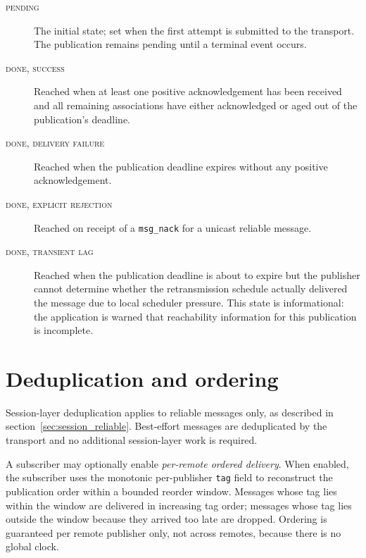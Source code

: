 \begin{description}
    \item[\textsc{pending}] The initial state; set when the first attempt is
    submitted to the transport. The publication remains pending until a
    terminal event occurs.
    \item[\textsc{done, success}] Reached when at least one positive
    acknowledgement has been received and all remaining associations have
    either acknowledged or aged out of the publication's deadline.
    \item[\textsc{done, delivery failure}] Reached when the publication
    deadline expires without any positive acknowledgement.
    \item[\textsc{done, explicit rejection}] Reached on receipt of a
    \texttt{msg\_nack} for a unicast reliable message.
    \item[\textsc{done, transient lag}] Reached when the publication
    deadline is about to expire but the publisher cannot determine whether
    the retransmission schedule actually delivered the message due to local
    scheduler pressure. This state is informational: the application is
    warned that reachability information for this publication is
    incomplete.
\end{description}

\section{Deduplication and ordering}\label{sec:session_dedup}

Session-layer deduplication applies to reliable messages only, as described in
section~\ref{sec:session_reliable}. Best-effort messages are deduplicated by
the transport and no additional session-layer work is required.

A subscriber may optionally enable \emph{per-remote ordered delivery}.
When enabled, the subscriber uses the monotonic per-publisher \texttt{tag}
field to reconstruct the publication order within a bounded reorder window.
Messages whose tag lies within the window are delivered in increasing tag
order; messages whose tag lies outside the window because they arrived too
late are dropped. Ordering is guaranteed per remote publisher only, not across
remotes, because there is no global clock.
